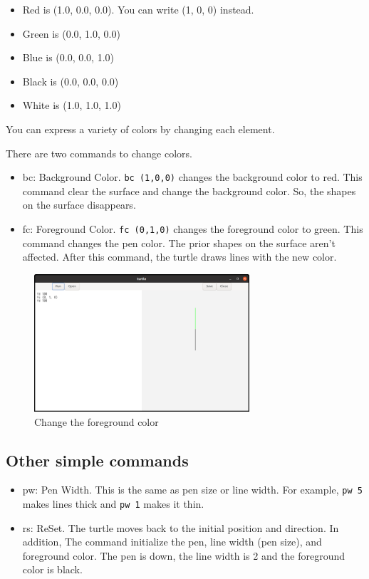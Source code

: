 \begin{itemize}
\tightlist
\item
  Red is (1.0, 0.0, 0.0). You can write (1, 0, 0) instead.
\item
  Green is (0.0, 1.0, 0.0)
\item
  Blue is (0.0, 0.0, 1.0)
\item
  Black is (0.0, 0.0, 0.0)
\item
  White is (1.0, 1.0, 1.0)
\end{itemize}

You can express a variety of colors by changing each element.

There are two commands to change colors.

\begin{itemize}
\tightlist
\item
  bc: Background Color. \passthrough{\lstinline!bc (1,0,0)!} changes the
  background color to red. This command clear the surface and change the
  background color. So, the shapes on the surface disappears.
\item
  fc: Foreground Color. \passthrough{\lstinline!fc (0,1,0)!} changes the
  foreground color to green. This command changes the pen color. The
  prior shapes on the surface aren't affected. After this command, the
  turtle draws lines with the new color.
\end{itemize}

\begin{figure}
\centering
\includegraphics[width=8cm,height=5.11cm]{../src/turtle/image/turtle3.png}
\caption{Change the foreground color}
\end{figure}

\subsection{Other simple commands}\label{other-simple-commands}

\begin{itemize}
\tightlist
\item
  pw: Pen Width. This is the same as pen size or line width. For
  example, \passthrough{\lstinline!pw 5!} makes lines thick and
  \passthrough{\lstinline!pw 1!} makes it thin.
\item
  rs: ReSet. The turtle moves back to the initial position and
  direction. In addition, The command initialize the pen, line width
  (pen size), and foreground color. The pen is down, the line width is 2
  and the foreground color is black.
\end{itemize}

